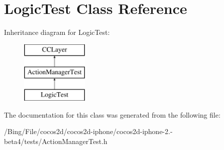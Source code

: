 \hypertarget{interface_logic_test}{\section{Logic\-Test Class Reference}
\label{interface_logic_test}
}
Inheritance diagram for Logic\-Test\-:\begin{figure}[H]
\begin{center}
\leavevmode
\includegraphics[height=3.000000cm]{interface_logic_test}
\end{center}
\end{figure}


The documentation for this class was generated from the following file\-:\begin{DoxyCompactItemize}
\item 
/\-Bing/\-File/cocos2d/cocos2d-\/iphone/cocos2d-\/iphone-\/2.-\/beta4/tests/Action\-Manager\-Test.\-h\end{DoxyCompactItemize}
